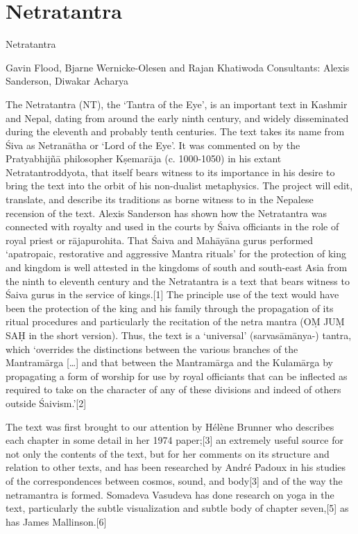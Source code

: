 {\section{Netratantra}

Netratantra

Gavin Flood, Bjarne Wernicke-Olesen and Rajan Khatiwoda
Consultants: Alexis Sanderson, Diwakar Acharya

The Netratantra (NT), the ‘Tantra of the Eye’, is an important text in Kashmir and Nepal, dating from around the early ninth century, and widely disseminated during the eleventh and probably tenth centuries. The text takes its name from Śiva as Netranātha or ‘Lord of the Eye’. It was commented on by the Pratyabhijñā philosopher Kṣemarāja (c. 1000-1050) in his extant Netratantroddyota, that itself bears witness to its importance in his desire to bring the text into the orbit of his non-dualist metaphysics. The project will edit, translate, and describe its traditions as borne witness to in the Nepalese recension of the text. Alexis Sanderson has shown how the Netratantra was connected with royalty and used in the courts by Śaiva officiants in the role of royal priest or rājapurohita. That Śaiva and Mahāyāna gurus performed ‘apatropaic, restorative and aggressive Mantra rituals’ for the protection of king and kingdom is well attested in the kingdoms of south and south-east Asia from the ninth to eleventh century and the Netratantra is a text that bears witness to Śaiva gurus in the service of kings.[1] The principle use of the text would have been the protection of the king and his family through the propagation of its ritual procedures and particularly the recitation of the netra mantra (OṂ JUṂ SAḤ in the short version). Thus, the text is a ‘universal’ (sarvasāmānya-) tantra, which ‘overrides the distinctions between the various branches of the Mantramārga […] and that between the Mantramārga and the Kulamārga by propagating a form of worship for use by royal officiants that can be inflected as required to take on the character of any of these divisions and indeed of others outside Śaivism.’[2]

The text was first brought to our attention by Hélène Brunner who describes each chapter in some detail in her 1974 paper;[3] an extremely useful source for not only the contents of the text, but for her comments on its structure and relation to other texts, and has been researched by André Padoux in his studies of the correspondences between cosmos, sound, and body[3] and of the way the netramantra is formed. Somadeva Vasudeva has done research on yoga in the text, particularly the subtle visualization and subtle body of chapter seven,[5] as has James Mallinson.[6]

}
